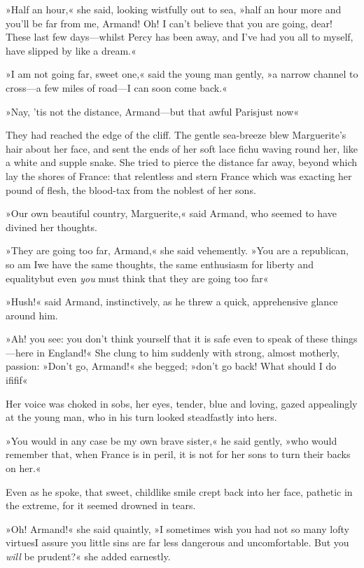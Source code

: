 »Half an hour,« she said, looking wistfully out to sea, »half an hour more and you'll be far from me, Armand! Oh! I can't believe that you are going, dear! These last few days—whilst Percy has been away, and I've had you all to myself, have slipped by like a dream.«

»I am not going far, sweet one,« said the young man gently, »a narrow channel to cross—a few miles of road—I can soon come back.«

»Nay, 'tis not the distance, Armand—but that awful Paris\textellipsis \allowbreak  just now\textellipsis«

They had reached the edge of the cliff. The gentle sea-breeze blew Marguerite's hair about her face, and sent the ends of her soft lace fichu waving round her, like a white and supple snake. She tried to pierce the distance far away, beyond which lay the shores of France: that relentless and stern France which was exacting her pound of flesh, the blood-tax from the noblest of her sons.

»Our own beautiful country, Marguerite,« said Armand, who seemed to have divined her thoughts.

»They are going too far, Armand,« she said vehemently. »You are a republican, so am I\textellipsis \allowbreak  we have the same thoughts, the same enthusiasm for liberty and equality\textellipsis \allowbreak  but even \textit{you} must think that they are going too far\textellipsis«

»Hush!\longdash« said Armand, instinctively, as he threw a quick, apprehensive glance around him.

»Ah! you see: you don't think yourself that it is safe even to speak of these things—here in England!« She clung to him suddenly with strong, almost motherly, passion: »Don't go, Armand!« she begged; »don't go back! What should I do if\textellipsis \allowbreak  if\textellipsis \allowbreak  if\textellipsis«

Her voice was choked in sobs, her eyes, tender, blue and loving, gazed appealingly at the young man, who in his turn looked steadfastly into hers.

»You would in any case be my own brave sister,« he said gently, »who would remember that, when France is in peril, it is not for her sons to turn their backs on her.«

Even as he spoke, that sweet, childlike smile crept back into her face, pathetic in the extreme, for it seemed drowned in tears.

»Oh! Armand!« she said quaintly, »I sometimes wish you had not so many lofty virtues\textellipsis \allowbreak  I assure you little sins are far less dangerous and uncomfortable. But you \textit{will} be prudent?« she added earnestly.

